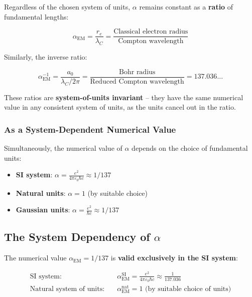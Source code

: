 \documentclass[12pt,a4paper]{article}
\begin{document}
Regardless of the chosen system of units, $\alpha$ remains constant as a \textbf{ratio} of fundamental lengths:

\begin{equation}
	\alpha_{\text{EM}} = \frac{r_e}{\lambda_C} = \frac{\text{Classical electron radius}}{\text{Compton wavelength}}
	\label{eq:alpha_ratio_re}
\end{equation}

Similarly, the inverse ratio:

\begin{equation}
	\alpha_{\text{EM}}^{-1} = \frac{a_0}{\lambda_C/2\pi} = \frac{\text{Bohr radius}}{\text{Reduced Compton wavelength}} = 137.036...
	\label{eq:alpha_ratio_bohr}
\end{equation}

These ratios are \textbf{system-of-units invariant} -- they have the same numerical value in any consistent system of units, as the units cancel out in the ratio.

\subsubsection{As a System-Dependent Numerical Value}
\label{subsubsec:system_dependent}

Simultaneously, the numerical value of $\alpha$ depends on the choice of fundamental units:

\begin{itemize}
	\item \textbf{SI system}: $\alpha = \frac{e^2}{4\pi\varepsilon_0\hbar c} \approx 1/137$
	\item \textbf{Natural units}: $\alpha = 1$ (by suitable choice)
	\item \textbf{Gaussian units}: $\alpha = \frac{e^2}{\hbar c} \approx 1/137$
\end{itemize}

\subsection{The System Dependency of $\alpha$}
\label{subsec:alpha_system_dependency}

The numerical value $\alpha_{\text{EM}} = 1/137$ is \textbf{valid exclusively in the SI system}:

\begin{align}
	\text{SI system:} \quad &\alpha_{\text{EM}}^{\text{SI}} = \frac{e^2}{4\pi\varepsilon_0\hbar c} \approx \frac{1}{137.036} \\
	\text{Natural system of units:} \quad &\alpha_{\text{EM}}^{\text{nat}} = 1 \text{ (by suitable choice of units)}
\end{align}
\end{document}
